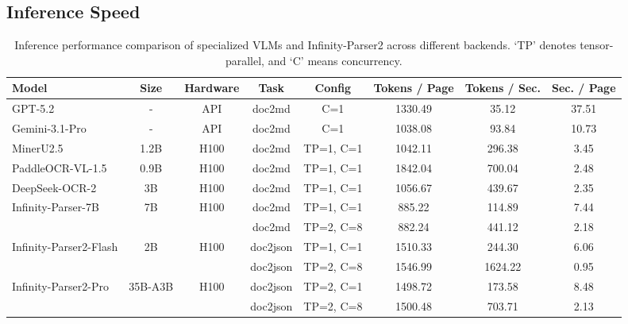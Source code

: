 \subsection{Inference Speed}

\begin{table}[htbp]
\centering
\small
\caption{Inference performance comparison of specialized VLMs and Infinity-Parser2 across different backends. `TP' denotes tensor-parallel, and `C' means concurrency.}
\label{tab:inference_speed}
\begin{tabular}{lccccccc}
\toprule
\textbf{Model} & \textbf{Size} & \textbf{Hardware} & \textbf{Task} & \textbf{Config} & \textbf{Tokens / Page} & \textbf{Tokens / Sec.} & \textbf{Sec. / Page} \\
\midrule
GPT-5.2 & - & API & doc2md & C=1 & 1330.49 & 35.12 & 37.51 \\
Gemini-3.1-Pro & - & API & doc2md & C=1 & 1038.08 & 93.84 & 10.73 \\
\midrule
MinerU2.5 & 1.2B & H100 & doc2md & TP=1, C=1 & 1042.11 & 296.38 & 3.45 \\
PaddleOCR-VL-1.5 & 0.9B & H100 & doc2md & TP=1, C=1 & 1842.04 & 700.04 & 2.48 \\
DeepSeek-OCR-2 & 3B & H100 & doc2md & TP=1, C=1 & 1056.67 & 439.67 & 2.35 \\
\midrule
\multirow{2}{*}{Infinity-Parser-7B} & \multirow{2}{*}{7B} & \multirow{2}{*}{H100} & doc2md & TP=1, C=1 & 885.22 & 114.89 & 7.44 \\
 &  &  & doc2md & TP=2, C=8 & 882.24 & 441.12 & 2.18 \\
\midrule
\multirow{2}{*}{Infinity-Parser2-Flash} & \multirow{2}{*}{2B} & \multirow{2}{*}{H100} & doc2json & TP=1, C=1 & 1510.33 & 244.30 & 6.06 \\
 & & & doc2json & TP=2, C=8 & 1546.99 & 1624.22 & 0.95 \\
\midrule
\multirow{2}{*}{Infinity-Parser2-Pro} & \multirow{2}{*}{35B-A3B} & \multirow{2}{*}{H100} & doc2json & TP=2, C=1 & 1498.72 & 173.58 & 8.48 \\
 & & & doc2json & TP=2, C=8 & 1500.48 & 703.71 & 2.13 \\
\bottomrule
\end{tabular}
\end{table}

